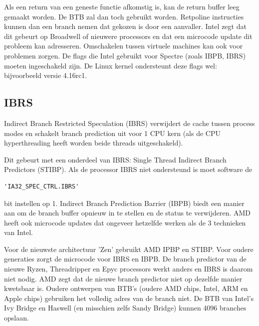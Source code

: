 Als een return van een geneste functie afkomstig is, kan de return buffer leeg gemaakt worden. De BTB zal dan toch gebruikt worden. Retpoline instructies kunnen dan een branch nemen dat gekozen is door een aanvaller. Intel zegt dat dit gebeurt op Broadwell of nieuwere processors en dat een microcode update dit probleem kan adresseren.
Omschakelen tussen virtuele machines kan ook voor problemen zorgen. De flags die Intel gebruikt voor Spectre (zoals IBPB, IBRS) moeten ingeschakeld zijn. De Linux kernel ondersteunt deze flags wel: bijvoorbeeld versie 4.16rc1.

\subsection{IBRS}


Indirect Branch Restricted Speculation (IBRS) verwijdert de cache tussen process modes en schakelt branch prediction uit voor 1 CPU kern (als de CPU hyperthreading heeft worden beide threads uitgeschakeld).

Dit gebeurt met een onderdeel van IBRS: Single Thread Indirect Branch Predictors (STIBP).
Als de processor IBRS niet ondersteund is moet software de \begin{verbatim}'IA32_SPEC_CTRL.IBRS'\end{verbatim}
bit instellen op 1.
Indirect Branch Prediction Barrier (IBPB) biedt een manier aan om de branch buffer opnieuw in te stellen en de status te verwijderen. AMD heeft ook microcode updates dat ongeveer hetzelfde werken als de 3 technieken van Intel.


Voor de nieuwste architectuur 'Zen' gebruikt AMD IPBP en STIBP. Voor oudere generaties zorgt de microcode voor IBRS en IBPB. De branch predictor van de nieuwe Ryzen, Threadripper en Epyc processors werkt anders en IBRS is daarom niet nodig. AMD zegt dat de nieuwe branch predictor niet op dezelfde manier kwetsbaar is. Oudere ontwerpen van BTB's (oudere AMD chips, Intel, ARM en Apple chips) gebruiken het volledig adres van de branch niet.
De BTB van Intel's Ivy Bridge en Haswell (en misschien zelfs Sandy Bridge) kunnen 4096 branches opslaan.\parencite{Godbolt2016}


